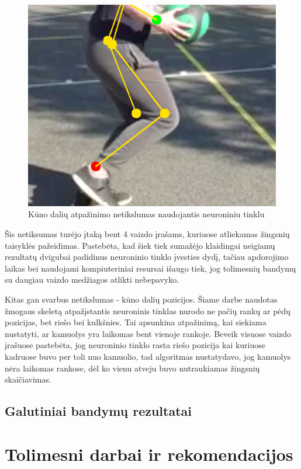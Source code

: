 \documentclass{VUMIFPSbakalaurinis}
\begin{document}
\begin{figure}[H]
	\centering
	\includegraphics[scale=0.6]{img/neural_network_fault.png}
	\caption{ Kūno dalių atpažinimo netikslumas naudojantis neuroniniu tinklu }
	\label{img:neural_network_fault}
\end{figure}

Šis netiksumas turėjo įtaką bent 4 vaizdo įrašams, kuriuose atliekamas žingsnių taisyklės pažeidimas. Pastebėta, kad šiek tiek sumažėjo klaidingai neigiamų rezultatų dvigubai padidinus neuroninio tinklo įvesties dydį, tačiau apdorojimo laikas bei naudojami kompiuteriniai resursai išaugo tiek, jog tolimesnių bandymų su daugiau vaizdo medžiagos atlikti nebepavyko.

Kitas gan svarbus netikslumas - kūno dalių pozicijos. Šiame darbe naudotas žmogaus skeletą atpažįstantis neuroninis tinklas nurodo ne pačių rankų ar pėdų pozicijas, bet riešo bei kulkšnies. Tai apsunkina atpažinimą, kai siekiama nustatyti, ar kamuolys yra laikomas bent vienoje rankoje. Beveik visuose vaizdo įrašuose pastebėta, jog neuroninio tinklo rasta riešo pozicija kai kuriuose kadruose buvo per toli nuo kamuolio, tad algoritmas nustatydavo, jog kamuolys nėra laikomas rankose, dėl ko vienu atveju buvo nutraukiamas žingsnių skaičiavimas. 

\subsection{Galutiniai bandymų rezultatai}

\section{Tolimesni darbai ir rekomendacijos}
\end{document}
